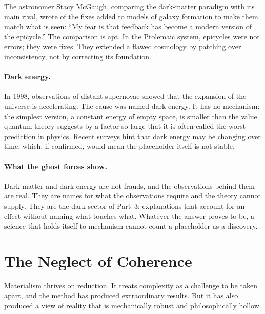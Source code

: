 \documentclass[11pt,a4paper]{article}
\begin{document}
The astronomer Stacy McGaugh, comparing the dark-matter paradigm with its main rival, wrote of the fixes added to models of galaxy formation to make them match what is seen: ``My fear is that feedback has become a modern version of the epicycle.'' The comparison is apt. In the Ptolemaic system, epicycles were not errors; they were fixes. They extended a flawed cosmology by patching over inconsistency, not by correcting its foundation.

\paragraph{Dark energy.} In 1998, observations of distant supernovae showed that the expansion of the universe is accelerating. The cause was named dark energy. It has no mechanism: the simplest version, a constant energy of empty space, is smaller than the value quantum theory suggests by a factor so large that it is often called the worst prediction in physics. Recent surveys hint that dark energy may be changing over time, which, if confirmed, would mean the placeholder itself is not stable.

\paragraph{What the ghost forces show.} Dark matter and dark energy are not frauds, and the observations behind them are real. They are names for what the observations require and the theory cannot supply. They are the dark sector of Part~3: explanations that account for an effect without naming what touches what.  Whatever the answer proves to be, a science that holds itself to mechanism cannot count a placeholder as a discovery.

\section{The Neglect of Coherence}
\label{sec:coherence}

Materialism thrives on reduction. It treats complexity as a challenge to be taken apart, and the method has produced extraordinary results. But it has also produced a view of reality that is mechanically robust and philosophically hollow.
\end{document}

